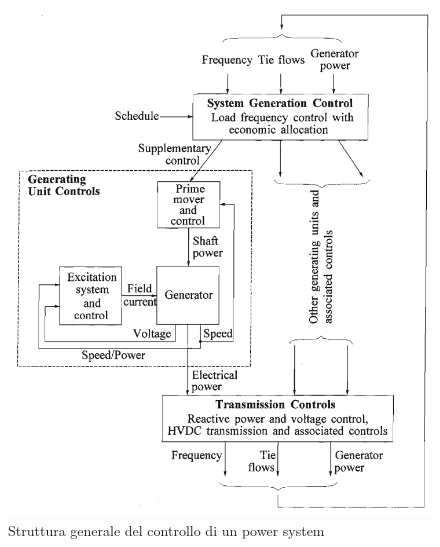 \documentclass[Lau,noexaminfo]{sapthesis}
\begin{document}
	\begin{figure}[h]
	\centering
	\includegraphics[scale=0.4]{controllo_generico}
	\caption{Struttura generale del controllo di un power system}
	\end{figure}
\end{document}
